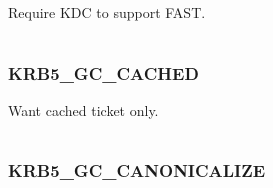 \documentclass[letterpaper,10pt,english]{sphinxmanual}
\begin{document}
\begin{fulllineitems}
\label{appdev/refs/macros/KRB5_FAST_REQUIRED:KRB5_FAST_REQUIRED}
\end{fulllineitems}


Require KDC to support FAST.

\begin{tabulary}{\linewidth}{|L|L|}
\hline

 & 
\\
\hline\end{tabulary}



\subsubsection{KRB5\_GC\_CACHED}
\label{appdev/refs/macros/KRB5_GC_CACHED:krb5-gc-cached}\label{appdev/refs/macros/KRB5_GC_CACHED:krb5-gc-cached-data}\label{appdev/refs/macros/KRB5_GC_CACHED::doc}

\begin{fulllineitems}
\label{appdev/refs/macros/KRB5_GC_CACHED:KRB5_GC_CACHED}
\end{fulllineitems}


Want cached ticket only.

\begin{tabulary}{\linewidth}{|L|L|}
\hline

 & 
\\
\hline\end{tabulary}



\subsubsection{KRB5\_GC\_CANONICALIZE}
\label{appdev/refs/macros/KRB5_GC_CANONICALIZE:krb5-gc-canonicalize-data}\label{appdev/refs/macros/KRB5_GC_CANONICALIZE:krb5-gc-canonicalize}\label{appdev/refs/macros/KRB5_GC_CANONICALIZE::doc}

\begin{fulllineitems}
\label{appdev/refs/macros/KRB5_GC_CANONICALIZE:KRB5_GC_CANONICALIZE}
\end{fulllineitems}
\end{document}
